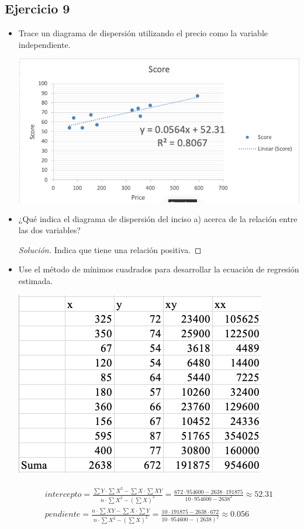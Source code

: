 \documentclass[a4paper,12pt]{article}
\newenvironment{solution}
  {\renewcommand\qedsymbol{$\blacksquare$}\begin{proof}[Solución]}
  {\end{proof}}
\begin{document}
\subsection{Ejercicio 9}
\begin{itemize}
    \item Trace un diagrama de dispersión utilizando el precio como la variable independiente.
    \begin{center}
        \includegraphics[scale=0.5]{Imagenes/9-1.png}
    \end{center}
    \item ¿Qué indica el diagrama de dispersión del inciso a) acerca de la relación entre las dos variables?
    \begin{solution}
    Indica que tiene una relación positiva.
    \end{solution}
    
    \item Use el método de mínimos cuadrados para desarrollar la ecuación de regresión estimada.
    \begin{center}
        \includegraphics[scale=0.5]{Imagenes/9-2.png}
    \end{center}
    \begin{align}
\begin{array}{l}
intercepto=\frac{\sum Y \cdot \sum X^{2}-\sum X \cdot \sum X Y}{n \cdot \sum X^{2}-\left(\sum X\right)^{2}}=\frac{672 \cdot 954600-2638 \cdot 191875}{10 \cdot 954600-2638^{2}} \approx 52.31 \\
pendiente=\frac{n \cdot \sum X Y-\sum X \cdot \sum Y}{n \cdot \sum X^{2}-\left(\sum X\right)^{2}}=\frac{10 \cdot 191875-2638 \cdot 672}{10 \cdot 954600-(2638)^{2}} \approx 0.056
\end{array}
\end{align}


\end{itemize}
\end{document}
